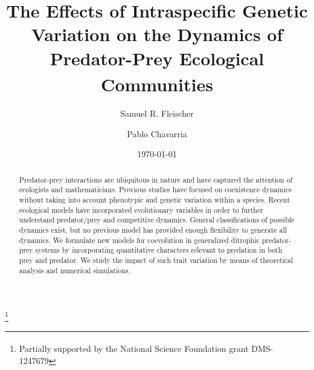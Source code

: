 \documentclass{amsart}
\theoremstyle{definition}
\theoremstyle{remark}
\numberwithin{equation}{section}
\begin{document}
\title[]{The Effects of Intraspecific Genetic Variation on the Dynamics of Predator-Prey Ecological Communities\textsuperscript{\tiny *}}

\author{Samuel R. Fleischer}

\author{Pablo Chavarria}

\address{Department of Mathematics, California State University, Northridge}
\curraddr{}
\thanks{\textsuperscript{\tiny *}Partially supported by the National Science Foundation grant DMS-1247679}
\date{\today}























\begin{abstract}
Predator-prey interactions are ubiquitous in nature and have captured the attention of ecologists and mathematicians.  Previous studies have focused on coexistence dynamics without taking into account phenotypic and genetic variation within a species.  Recent ecological models have incorporated evolutionary variables in order to further understand predator/prey and competitive dynamics.  General classifications of possible dynamics exist, but no previous model has provided enough flexibility to generate all dynamics.  We formulate new models for coevolution in generalized ditrophic predator-prey systems by incorporating quantitative characters relevant to predation in both prey and predator.  We study the impact of such trait variation by means of theoretical analysis and numerical simulations.
\end{abstract}
\end{document}
